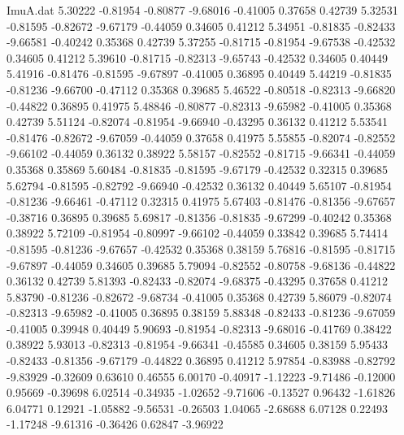 \begin{filecontents}{ImuA.dat}
   5.30222   -0.81954   -0.80877   -9.68016   -0.41005    0.37658    0.42739
   5.32531   -0.81595   -0.82672   -9.67179   -0.44059    0.34605    0.41212
   5.34951   -0.81835   -0.82433   -9.66581   -0.40242    0.35368    0.42739
   5.37255   -0.81715   -0.81954   -9.67538   -0.42532    0.34605    0.41212
   5.39610   -0.81715   -0.82313   -9.65743   -0.42532    0.34605    0.40449
   5.41916   -0.81476   -0.81595   -9.67897   -0.41005    0.36895    0.40449
   5.44219   -0.81835   -0.81236   -9.66700   -0.47112    0.35368    0.39685
   5.46522   -0.80518   -0.82313   -9.66820   -0.44822    0.36895    0.41975
   5.48846   -0.80877   -0.82313   -9.65982   -0.41005    0.35368    0.42739
   5.51124   -0.82074   -0.81954   -9.66940   -0.43295    0.36132    0.41212
   5.53541   -0.81476   -0.82672   -9.67059   -0.44059    0.37658    0.41975
   5.55855   -0.82074   -0.82552   -9.66102   -0.44059    0.36132    0.38922
   5.58157   -0.82552   -0.81715   -9.66341   -0.44059    0.35368    0.35869
   5.60484   -0.81835   -0.81595   -9.67179   -0.42532    0.32315    0.39685
   5.62794   -0.81595   -0.82792   -9.66940   -0.42532    0.36132    0.40449
   5.65107   -0.81954   -0.81236   -9.66461   -0.47112    0.32315    0.41975
   5.67403   -0.81476   -0.81356   -9.67657   -0.38716    0.36895    0.39685
   5.69817   -0.81356   -0.81835   -9.67299   -0.40242    0.35368    0.38922
   5.72109   -0.81954   -0.80997   -9.66102   -0.44059    0.33842    0.39685
   5.74414   -0.81595   -0.81236   -9.67657   -0.42532    0.35368    0.38159
   5.76816   -0.81595   -0.81715   -9.67897   -0.44059    0.34605    0.39685
   5.79094   -0.82552   -0.80758   -9.68136   -0.44822    0.36132    0.42739
   5.81393   -0.82433   -0.82074   -9.68375   -0.43295    0.37658    0.41212
   5.83790   -0.81236   -0.82672   -9.68734   -0.41005    0.35368    0.42739
   5.86079   -0.82074   -0.82313   -9.65982   -0.41005    0.36895    0.38159
   5.88348   -0.82433   -0.81236   -9.67059   -0.41005    0.39948    0.40449
   5.90693   -0.81954   -0.82313   -9.68016   -0.41769    0.38422    0.38922
   5.93013   -0.82313   -0.81954   -9.66341   -0.45585    0.34605    0.38159
   5.95433   -0.82433   -0.81356   -9.67179   -0.44822    0.36895    0.41212
   5.97854   -0.83988   -0.82792   -9.83929   -0.32609    0.63610    0.46555
   6.00170   -0.40917   -1.12223   -9.71486   -0.12000    0.95669   -0.39698
   6.02514   -0.34935   -1.02652   -9.71606   -0.13527    0.96432   -1.61826
   6.04771    0.12921   -1.05882   -9.56531   -0.26503    1.04065   -2.68688
   6.07128    0.22493   -1.17248   -9.61316   -0.36426    0.62847   -3.96922

\end{filecontents}
